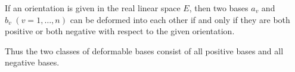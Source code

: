 If an orientation is given in the real linear space $E$, then two bases $a_v$ and $b_v\;(v = 1, \ldots, n)$ can be deformed into each other if and only if they are both positive or both negative with respect to the given orientation.

Thus the two classes of deformable bases consist of all positive bases and all negative bases.
